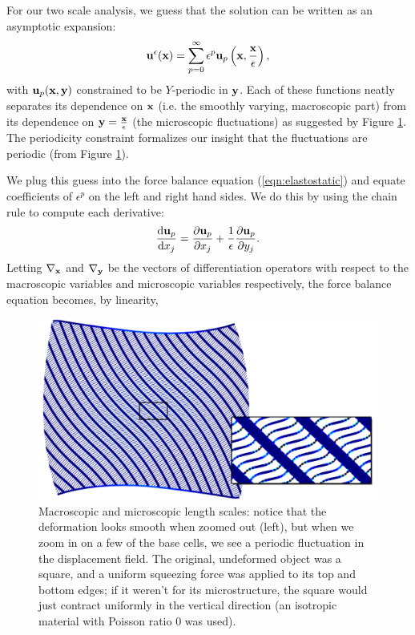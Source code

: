 \documentclass[10pt]{article}
\providecommand{\e}{\epsilon}
\providecommand{\pder}[2]{\frac{\partial #1}{\partial #2}}
\providecommand{\tder}[2]{\frac{\mathrm{d} #1}{\mathrm{d} #2}}
\begin{document}
For our two scale analysis, we guess that the solution can be written as an asymptotic
expansion:
$$
{\bf u}^\e({\bf x}) = \sum_{p = 0}^{\infty} \e^p {\bf u}_p\left({\bf x}, \frac{{\bf x}}{\e}\right),
$$
with ${\bf u}_p({\bf x}, {\bf y})$ constrained to be $Y$-periodic in ${\bf y}$.
Each of these functions neatly separates its dependence on ${\bf x}$ (i.e. the
smoothly varying, macroscopic part) from its dependence on ${\bf y} = \frac{{\bf
x}}{\e}$ (the microscopic fluctuations) as suggested by Figure
\ref{fig:two_scale}. The periodicity constraint formalizes our insight that
the fluctuations are periodic (from Figure \ref{fig:two_scale}).

We plug this guess into the force balance equation (\ref{eqn:elastostatic}) and
equate coefficients of $\e^p$ on the left and right hand sides. We do this by
using the chain rule to compute each derivative:
$$
\tder{{\bf u}_p}{x_j} = \pder{{\bf u}_p}{x_j} + \frac{1}{\e} \pder{{\bf u}_p}{y_j}.
$$
Letting $\nabla_{\bf x}$ and $\nabla_{\bf y}$ be the vectors of differentiation
operators with respect to the macroscopic variables and microscopic variables
respectively, the force balance equation becomes, by linearity,

\begin{figure}
    \centering
    \includegraphics[width=.6\textwidth]{Images/two_scale.png}
    \caption{Macroscopic and microscopic length scales: notice that the
             deformation looks smooth when zoomed out (left), but when we zoom
             in on a few of the base cells, we see a periodic fluctuation
             in the displacement field. The original, undeformed object was a
             square, and a uniform squeezing force was applied to its top and
             bottom edges; if it weren't for its microstructure, the square
             would just contract uniformly in the vertical direction (an
             isotropic material with Poisson ratio 0 was used).}
    \label{fig:two_scale}
\end{figure}
\end{document}
